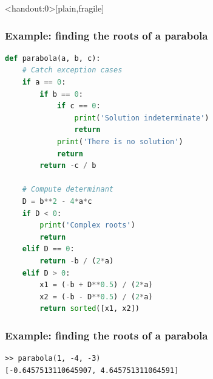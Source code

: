 \begin{frame}<handout:0>[plain,fragile]
  \frametitle{Example: finding the roots of a parabola}
  \small\selectfont
  \begin{lstlisting}[language=Python,basicstyle=\scriptsize\ttfamily]
def parabola(a, b, c):
    # Catch exception cases
    if a == 0:
        if b == 0:
            if c == 0:
                print('Solution indeterminate')
                return
            print('There is no solution')
            return
        return -c / b

    # Compute determinant
    D = b**2 - 4*a*c
    if D < 0:
        print('Complex roots')
        return
    elif D == 0:
        return -b / (2*a)
    elif D > 0:
        x1 = (-b + D**0.5) / (2*a)
        x2 = (-b - D**0.5) / (2*a)
        return sorted([x1, x2])
  \end{lstlisting}
\end{frame}

\begin{frame}[fragile]
  \frametitle{Example: finding the roots of a parabola}
  \begin{lstlisting}
>> parabola(1, -4, -3)
[-0.6457513110645907, 4.645751311064591]
  \end{lstlisting}
\end{frame}


